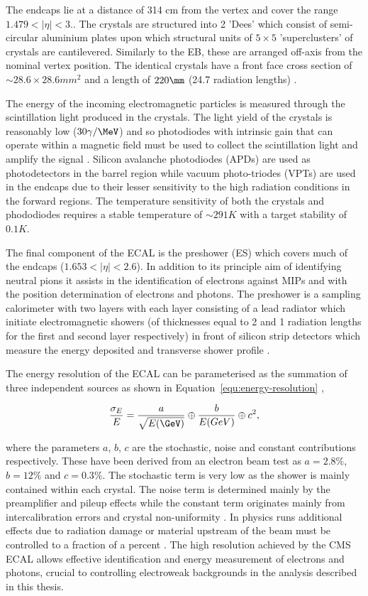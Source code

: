 The endcaps lie at a distance of 314 cm from the vertex and cover the range $1.479 < |\eta| < 3.$. The crystals
are structured into 2 'Dees' which consist of semi-circular aluminium plates upon which structural units of 
$5\times5$ 'superclusters' of crystals are cantilevered. Similarly to the EB, these are arranged off-axis from
the nominal vertex position. The identical crystals have a front face cross section of 
$\sim 28.6\times28.6 mm^2$ and a length of $220\mm$ (24.7 radiation lengths) \cite{CMS}.

The energy of the incoming electromagnetic particles is measured through the scintillation light produced
in the crystals. The light yield of the crystals is reasonably low ($30\gamma/\MeV$)
and so photodiodes with intrinsic gain that can operate within a magnetic field must be used to collect 
the scintillation light and amplify the signal \cite{ecal_tdr}. Silicon avalanche photodiodes (APDs) are used as photodetectors
in the barrel region while vacuum photo-triodes (VPTs) are used in the endcaps due to their lesser sensitivity
to the high radiation conditions in the forward regions. The temperature sensitivity of both the crystals 
and phododiodes requires a stable temperature of $\sim291K$ with a target stability of $0.1K$. 

The final component of the ECAL is the preshower (ES) which covers much of the endcaps ($1.653 < |\eta| < 2.6$). In addition
to its principle aim of identifying neutral pions it assists in the identification of electrons against MIPs and with
the position determination of electrons and photons. The preshower is a sampling calorimeter with two layers with each layer
consisting of a lead radiator which initiate electromagnetic showers (of thicknesses equal to 2 and 1 radiation lengths for the 
first and second layer respectively) in front of silicon strip detectors which 
measure the energy deposited and transverse shower profile \cite{ecal_tdr}.  

The energy resolution of the ECAL can be parameterised as the summation of three independent sources as shown 
in Equation~\ref{equ:energy-resolution} \cite{ecal_performance2},

\begin{equation}
\frac{\sigma_E}{E} = \frac{a}{\sqrt{E(\GeV)}} \oplus \frac{b}{E(GeV)} \oplus c^2,
\label{equ:energy-resolution}
\end{equation}

where the parameters $a$, $b$, $c$ are the stochastic, noise and constant contributions respectively. These have been
derived from an electron beam test as $a=2.8\%$, $b=12\%$ and $c=0.3\%$. The stochastic
term is very low as the shower is mainly contained within each crystal. The noise term is determined mainly by 
the preamplifier and pileup effects while the constant term originates mainly from intercalibration errors and crystal non-uniformity \cite{ecal_tdr}. 
In physics runs additional effects due to radiation damage or material upstream of the beam must be controlled to a 
fraction of a percent \cite{ecal_performance}. The high resolution achieved by the CMS ECAL allows effective identification and energy measurement of electrons and photons, crucial to
controlling electroweak backgrounds in the analysis described in this thesis.

